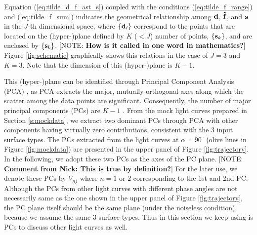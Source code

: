 \documentclass[iop,numberedappendix,apj,]{emulateapj}
\def\fast{\tilde f}
\def\memoYF#1{\color{red}[NOTE: {\bf #1}]\color{black}}
\begin{document}

Equation (\ref{eq:tilde_d_f_ast_s}) coupled with the conditions (\ref{eq:tilde_f_range}) and (\ref{eq:tilde_f_sum}) indicates the geometrical relationship among ${\bf d}$, ${\bf \fast }$, and ${\bf s}$ in the $J$-th dimensional space, where $\{{\bf d}_i\}$ correspond to the points that are located on the (hyper-)plane defined by $K$ ($<J$) number of points, $\{{\bf s}_k\} $, and are enclosed by $\{{\bf s}_k \}$. \memoYF{How is it called in one word in mathematics?}
Figure \ref{fig:schematic} graphically shows this relations in the case of $J=3$ and $K=3$. 
Note that the dimension of this (hyper-)plane is $K-1$.  

This (hyper-)plane can be identified through Principal Component Analysis (PCA) \citep{Cowan2009,Cowan2011}, as PCA extracts the major, mutually-orthogonal axes along which the scatter among the data points are significant. 
Consequently, the number of major principal components (PCs) are $K-1$ \citep{Cowan2011}. 
From the mock light curves prepared in Section \ref{s:mockdata}, we extract two dominant PCs through PCA with other components having virtually zero contributions, consistent with the 3 input surface types.  
The PCs extracted from the light curves at $\alpha = 90^{\circ }$ (olive lines in Figure \ref{fig:mockdata}) are presented in the upper panel of Figure \ref{fig:trajectory}. 
In the following, we adopt these two PCs as the axes of the PC plane. 
\memoYF{Comment from Nick: This is true by definition?}
For the later use, we denote these PCs by $V_{nj}$ where $n=1$ or $2$  corresponding to the 1st and 2nd PC. 
Although the PCs from other light curves with different phase angles are not necessarily same as the one shown in the upper panel of Figure \ref{fig:trajectory}, the PC plane itself should be the same plane (under the noiseless condition), because we assume the same 3 surface types. 
Thus in this section we keep using is PCs to discuss other light curves as well. 
\end{document}
